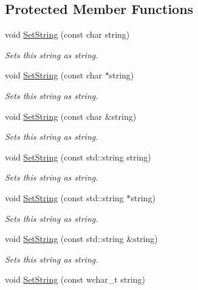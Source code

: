 \subsection*{Protected Member Functions}
\begin{DoxyCompactItemize}
\item 
void \hyperlink{class_triton_1_1_util_1_1_e_string_a754ea544123af0f81ceee1f49025da31}{Set\+String} (const char string)
\begin{DoxyCompactList}\small\item\em Sets this string as string. \end{DoxyCompactList}\item 
void \hyperlink{class_triton_1_1_util_1_1_e_string_aa00db62e09abbabc65b1b9a20362936d}{Set\+String} (const char $\ast$string)
\begin{DoxyCompactList}\small\item\em Sets this string as string. \end{DoxyCompactList}\item 
void \hyperlink{class_triton_1_1_util_1_1_e_string_a1e496c82603825e3a9a169a89de3eb7c}{Set\+String} (const char \&string)
\begin{DoxyCompactList}\small\item\em Sets this string as string. \end{DoxyCompactList}\item 
void \hyperlink{class_triton_1_1_util_1_1_e_string_ab59b2b703bcf7231a0892b1841ef3d26}{Set\+String} (const std\+::string string)
\begin{DoxyCompactList}\small\item\em Sets this string as string. \end{DoxyCompactList}\item 
void \hyperlink{class_triton_1_1_util_1_1_e_string_a209fab14fc51bcc1c3d3279bd39a7b3d}{Set\+String} (const std\+::string $\ast$string)
\begin{DoxyCompactList}\small\item\em Sets this string as string. \end{DoxyCompactList}\item 
void \hyperlink{class_triton_1_1_util_1_1_e_string_adfb1b49aa3502e276b847e658bd89417}{Set\+String} (const std\+::string \&string)
\begin{DoxyCompactList}\small\item\em Sets this string as string. \end{DoxyCompactList}\item 
void \hyperlink{class_triton_1_1_util_1_1_e_string_a439287d8ba8a2f119e3054196a65e03e}{Set\+String} (const wchar\+\_\+t string)

\end{DoxyCompactItemize}

